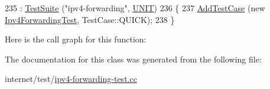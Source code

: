 \begin{DoxyCode}
235   : \hyperlink{classns3_1_1TestSuite_a904b0c40583b744d30908aeb94636d1a}{TestSuite} (\textcolor{stringliteral}{"ipv4-forwarding"}, \hyperlink{classns3_1_1TestSuite_a1ebfcab34ec8161e085e8e3a1855eae0a3885375a3787abf60431f8454b3cadbd}{UNIT})
236 \{
237   \hyperlink{classns3_1_1TestCase_a3718088e3eefd5d6454569d2e0ddd835}{AddTestCase} (\textcolor{keyword}{new} \hyperlink{classIpv4ForwardingTest}{Ipv4ForwardingTest}, TestCase::QUICK);
238 \}
\end{DoxyCode}


Here is the call graph for this function\+:




The documentation for this class was generated from the following file\+:\begin{DoxyCompactItemize}
\item 
internet/test/\hyperlink{ipv4-forwarding-test_8cc}{ipv4-\/forwarding-\/test.\+cc}\end{DoxyCompactItemize}
